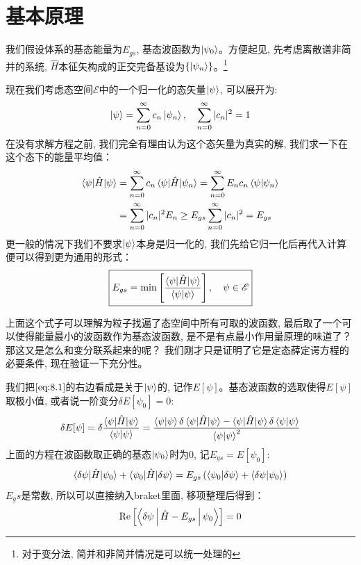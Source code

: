 \documentclass[a4paper,zihao=-4,linespread=1]{ctexrep}
\begin{document}
    \section{基本原理}
    我们假设体系的基态能量为$E_{gs}$, 基态波函数为$\ket{\psi_{0}}$。方便起见, 先考虑离散谱非简并的系统, $\hat{H}$本征矢构成的正交完备基设为$\{\ket{\psi_n}\}$。\footnote{对于变分法, 简并和非简并情况是可以统一处理的}

    现在我们考虑态空间$\mathscr{E}$中的一个归一化的态矢量$\ket{\psi}$, 可以展开为:
    \[\ket{\psi}=\sum_{n=0}^{\infty}c_n\ket{\psi_n},\quad\sum_{n=0}^{\infty}|c_n|^2=1\]
    在没有求解方程之前, 我们完全有理由认为这个态矢量为真实的解, 我们求一下在这个态下的能量平均值：
    \begin{align*}
        \braket{\psi|\hat{H}|\psi}&=\sum_{n=0}^{\infty}c_n\braket{\psi|\hat{H}|\psi_n}=\sum_{n=0}^{\infty}E_nc_n\braket{\psi|\psi_n}\\
        &=\sum_{n=0}^{\infty}|c_n|^2E_n\geq E_{gs}\sum_{n=0}^{\infty}|c_n|^2=E_{gs}
    \end{align*}
    更一般的情况下我们不要求$\ket{\psi}$本身是归一化的, 我们先给它归一化后再代入计算便可以得到更为通用的形式：
    \begin{equation}
        \label{eq:8.1}
        \boxed{
            E_{gs}=\mathrm{min}\left[\frac{\braket{\psi|\hat{H}|\psi}}{\braket{\psi|\psi}}\right],\quad\psi\in\mathscr{E}
        }
    \end{equation}

    上面这个式子可以理解为粒子找遍了态空间中所有可取的波函数, 最后取了一个可以使得能量最小的波函数作为基态波函数, 是不是有点最小作用量原理的味道了？那这又是怎么和变分联系起来的呢？
    我们刚才只是证明了它是定态薛定谔方程的必要条件, 现在验证一下充分性。

    我们把$\ref{eq:8.1}$的右边看成是关于$\ket{\psi}$的, 记作$E[\psi]$。基态波函数的选取使得$E[\psi]$取极小值, 或者说一阶变分$\delta E[\psi_0]=0$:
    \begin{equation*}
        \delta E[\psi]=\delta\frac{\braket{\psi|\hat{H}|\psi}}{\braket{\psi|\psi}}
        =\frac{\braket{\psi|\psi}\delta \braket{\psi|\hat{H}|\psi}-\braket{\psi|\hat{H}|\psi}\delta \braket{\psi|\psi}}{\braket{\psi|\psi}^2}
    \end{equation*}
    上面的方程在波函数取正确的基态$\ket{\psi_0}$时为0, 记$E_{gs}=E[\psi_0]$:
    \[\braket{\delta\psi|\hat{H}|\psi_0}+\braket{\psi_0|\hat{H}|\delta\psi}=E_{gs}\left(\braket{\psi_0|\delta\psi}+\braket{\delta\psi|\psi_0}\right)\]
    $E_gs$是常数, 所以可以直接纳入braket里面, 移项整理后得到：
    \[\mathrm{Re}\left[\Braket{\delta\psi|\hat{H}-E_{gs}|\psi_0}\right]=0\]
    
\end{document}
